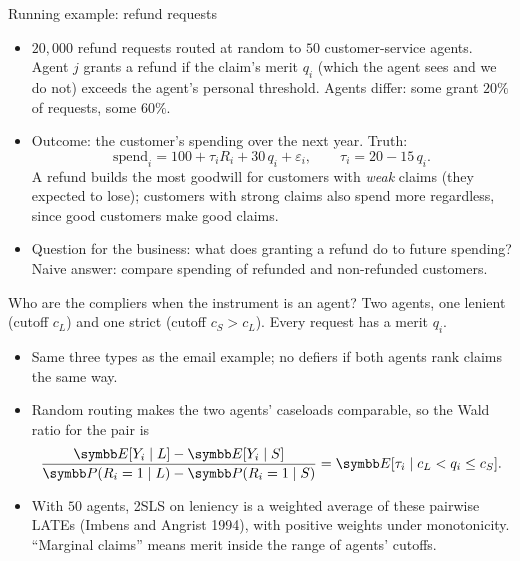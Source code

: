 \documentclass[aspectratio=169,11pt]{beamer}
\begin{document}
\begin{frame}{Running example: refund requests}
\begin{itemize}
	\item $20{,}000$ refund requests routed at random to $50$ customer-service agents. Agent $j$ grants a
	refund if the claim's merit $q_i$ (which the agent sees and we do not) exceeds the agent's personal
	threshold. Agents differ: some grant $20\%$ of requests, some $60\%$.
	\medskip
	\item Outcome: the customer's spending over the next year. Truth:
	\[
		\text{spend}_i = 100 + \tau_i R_i + 30\,q_i + \varepsilon_i, \qquad \tau_i = 20 - 15\,q_i .
	\]
	A refund builds the most goodwill for customers with \emph{weak} claims (they expected to lose); customers
	with strong claims also spend more regardless, since good customers make good claims.
	\medskip
	\item Question for the business: what does granting a refund do to future spending? Naive answer:
	compare spending of refunded and non-refunded customers.
\end{itemize}
\end{frame}


\begin{frame}{Who are the compliers when the instrument is an agent?}
Two agents, one lenient (cutoff $c_L$) and one strict (cutoff $c_S > c_L$). Every request has a merit $q_i$.
\begin{center}
\end{center}
\begin{itemize}
	\item Same three types as the email example; no defiers if both agents rank claims the same way.
	\item Random routing makes the two agents' caseloads comparable, so the Wald ratio for the pair is
	\[
		\frac{\E[Y_i \mid L] - \E[Y_i \mid S]}{\Pr(R_i = 1 \mid L) - \Pr(R_i = 1 \mid S)} = \E[\tau_i \mid c_L < q_i \le c_S].
	\]
	\item With $50$ agents, 2SLS on leniency is a \alert{weighted average of these pairwise LATEs} (Imbens and
	Angrist 1994), with positive weights under monotonicity. ``Marginal claims'' means merit inside the
	range of agents' cutoffs.
\end{itemize}
\end{frame}
\end{document}
